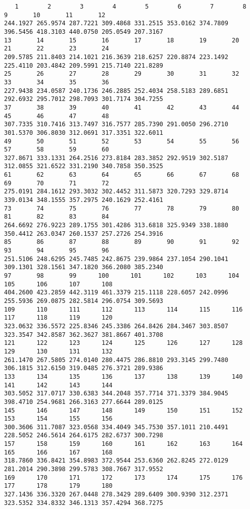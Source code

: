 \documentclass[12pt,letterpaper]{article}
\begin{document}
\begin{enumerate}
\begin{verbatim}
   1        2        3        4        5        6        7        8        9       10       11       12 
244.1927 265.9574 287.7221 309.4868 331.2515 353.0162 374.7809 396.5456 418.3103 440.0750 205.0549 207.3167 
13       14       15       16       17       18       19       20       21       22       23       24 
209.5785 211.8403 214.1021 216.3639 218.6257 220.8874 223.1492 225.4110 203.4842 209.5991 215.7140 221.8289 
25       26       27       28       29       30       31       32       33       34       35       36 
227.9438 234.0587 240.1736 246.2885 252.4034 258.5183 289.6851 292.6932 295.7012 298.7093 301.7174 304.7255 
37       38       39       40       41       42       43       44       45       46       47       48 
307.7335 310.7416 313.7497 316.7577 285.7390 291.0050 296.2710 301.5370 306.8030 312.0691 317.3351 322.6011 
49       50       51       52       53       54       55       56       57       58       59       60 
327.8671 333.1331 264.2516 273.8184 283.3852 292.9519 302.5187 312.0855 321.6522 331.2190 340.7858 350.3525 
61       62       63       64       65       66       67       68       69       70       71       72 
275.0191 284.1612 293.3032 302.4452 311.5873 320.7293 329.8714 339.0134 348.1555 357.2975 240.1629 252.4161 
73       74       75       76       77       78       79       80       81       82       83       84 
264.6692 276.9223 289.1755 301.4286 313.6818 325.9349 338.1880 350.4412 263.0347 260.1537 257.2726 254.3916 
85       86       87       88       89       90       91       92       93       94       95       96 
251.5106 248.6295 245.7485 242.8675 239.9864 237.1054 290.1041 309.1301 328.1561 347.1820 366.2080 385.2340 
97       98       99      100      101      102      103      104      105      106      107      108 
404.2600 423.2859 442.3119 461.3379 215.1118 228.6057 242.0996 255.5936 269.0875 282.5814 296.0754 309.5693 
109      110      111      112      113      114      115      116      117      118      119      120 
323.0632 336.5572 225.8346 245.3386 264.8426 284.3467 303.8507 323.3547 342.8587 362.3627 381.8667 401.3708 
121      122      123      124      125      126      127      128      129      130      131      132 
261.1470 267.5805 274.0140 280.4475 286.8810 293.3145 299.7480 306.1815 312.6150 319.0485 276.3721 289.9386 
133      134      135      136      137      138      139      140      141      142      143      144 
303.5052 317.0717 330.6383 344.2048 357.7714 371.3379 384.9045 398.4710 254.9681 266.3163 277.6644 289.0125 
145      146      147      148      149      150      151      152      153      154      155      156 
300.3606 311.7087 323.0568 334.4049 345.7530 357.1011 210.4491 228.5052 246.5614 264.6175 282.6737 300.7298 
157      158      159      160      161      162      163      164      165      166      167      168 
318.7860 336.8421 354.8983 372.9544 253.6360 262.8245 272.0129 281.2014 290.3898 299.5783 308.7667 317.9552 
169      170      171      172      173      174      175      176      177      178      179      180 
327.1436 336.3320 267.0448 278.3429 289.6409 300.9390 312.2371 323.5352 334.8332 346.1313 357.4294 368.7275 
\end{verbatim}
	

\end{enumerate}
\end{document}
